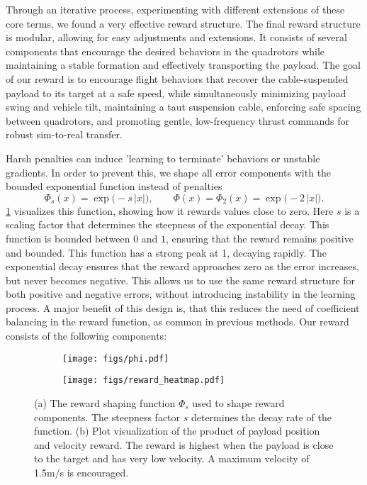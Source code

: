 Through an iterative process, experimenting with different extensions of these core terms, we found a very effective reward structure. The final reward structure is modular, allowing for easy adjustments and extensions. It consists of several components that encourage the desired behaviors in the quadrotors while maintaining a stable formation and effectively transporting the payload.
The goal of our reward is to encourage flight behaviors that recover the cable-suspended payload to its target at a safe speed, while simultaneously minimizing payload swing and vehicle tilt, maintaining a taut suspension cable, enforcing safe spacing between quadrotors, and promoting gentle, low-frequency thrust commands for robust sim-to-real transfer. 

Harsh penalties can induce 'learning to terminate' behaviors or unstable gradients. In order to prevent this, we shape all error components with the bounded exponential function instead of penalties
\begin{equation}
\Phi_s(x) = \exp\bigl(-s\,\lvert x\rvert\bigr),
\qquad
\Phi(x) = \Phi_2(x) = \exp\bigl(-2\,\lvert x\rvert\bigr).
\end{equation}
\ref{fig:reward_details} visualizes this function, showing how it rewards values close to zero. Here $s$ is a scaling factor that determines the steepness of the exponential decay. This function is bounded between $0$ and $1$, ensuring that the reward remains positive and bounded. This function has a strong peak at 1, decaying rapidly. The exponential decay ensures that the reward approaches zero as the error increases, but never becomes negative. This allows us to use the same reward structure for both positive and negative errors, without introducing instability in the learning process. A major benefit of this design is, that this reduces the need of coefficient balancing in the reward function, as common in previous methods. Our reward consists of the following components:
\begin{figure}

  \centering
  \begin{subfigure}[t]{0.49\textwidth}
    \centering
    \texttt{[image: figs/phi.pdf]}
    \caption{}
  \end{subfigure}
  \begin{subfigure}[t]{0.49\textwidth}
    \centering
    \texttt{[image: figs/reward\_heatmap.pdf]}
    \caption{}
  \end{subfigure}
  \caption[Reward Components]{
    (a) The reward shaping function \(\Phi_s\) used to shape reward components. The steepness factor \(s\) determines the decay rate of the function.
    (b) Plot visualization of the product of payload position and velocity reward. The reward is highest when the payload is close to the target and has very low velocity. A maximum velocity of 1.5m/s is encouraged.
  }
  \label{fig:reward_details}
\end{figure}
